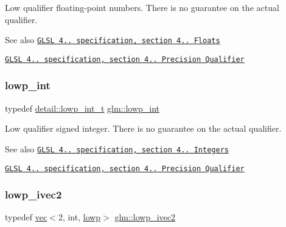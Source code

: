 Low qualifier floating-\/point numbers. There is no guarantee on the actual qualifier.

\begin{DoxySeeAlso}{See also}
\href{http://www.opengl.org/registry/doc/GLSLangSpec.4.20.8.pdf}{\tt G\+L\+SL 4.. specification, section 4.. Floats} 

\href{http://www.opengl.org/registry/doc/GLSLangSpec.4.20.8.pdf}{\tt G\+L\+SL 4.. specification, section 4.. Precision Qualifier} 
\end{DoxySeeAlso}
\mbox{\label{group__core__precision_ga4681244bf4a184734f03aa9df4e3d288}} 
\subsubsection{\texorpdfstring{lowp\+\_\+int}{lowp\_int}}
{\footnotesize\ttfamily typedef \hyperlink{namespaceglm_1_1detail_a030a8128e369fc1f9c7982dc68a78ba7}{detail\+::lowp\+\_\+int\+\_\+t} \hyperlink{group__core__precision_ga4681244bf4a184734f03aa9df4e3d288}{glm\+::lowp\+\_\+int}}

Low qualifier signed integer. There is no guarantee on the actual qualifier.

\begin{DoxySeeAlso}{See also}
\href{http://www.opengl.org/registry/doc/GLSLangSpec.4.20.8.pdf}{\tt G\+L\+SL 4.. specification, section 4.. Integers} 

\href{http://www.opengl.org/registry/doc/GLSLangSpec.4.20.8.pdf}{\tt G\+L\+SL 4.. specification, section 4.. Precision Qualifier} 
\end{DoxySeeAlso}
\mbox{\label{group__core__precision_gab85314d1bfbed099461a545d5fb75be1}} 
\subsubsection{\texorpdfstring{lowp\+\_\+ivec2}{lowp\_ivec2}}
{\footnotesize\ttfamily typedef \hyperlink{structglm_1_1vec}{vec}$<$2, int, \hyperlink{namespaceglm_a36ed105b07c7746804d7fdc7cc90ff25ae161af3fc695e696ce3bf69f7332bc2d}{lowp}$>$ \hyperlink{group__core__precision_gab85314d1bfbed099461a545d5fb75be1}{glm\+::lowp\+\_\+ivec2}}

